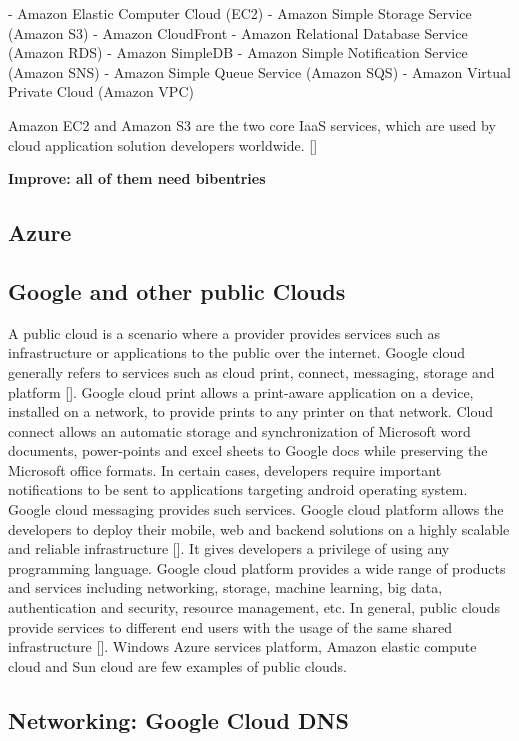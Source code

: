      -  Amazon Elastic Computer Cloud (EC2)
     -  Amazon Simple Storage Service (Amazon S3)
     -  Amazon CloudFront
     -  Amazon Relational Database Service (Amazon RDS)
     -  Amazon SimpleDB
     -  Amazon Simple Notification Service (Amazon SNS)
     -  Amazon Simple Queue Service (Amazon SQS)
     -  Amazon Virtual Private Cloud (Amazon VPC)

Amazon EC2 and Amazon S3 are the two core IaaS services, which are
used by cloud application solution developers
worldwide. [\cite{www-aws}]

     {\bf Improve: all of them need bibentries}
     
\subsection{Azure}
\subsection{Google and other public Clouds}

A public cloud is a scenario where a provider provides services such
as infrastructure or applications to the public over the
internet. Google cloud generally refers to services such as cloud
print, connect, messaging, storage and platform [\cite{goo1}]. Google
cloud print allows a print-aware application on a device, installed on
a network, to provide prints to any printer on that network. Cloud
connect allows an automatic storage and synchronization of Microsoft
word documents, power-points and excel sheets to Google docs while
preserving the Microsoft office formats. In certain cases, developers
require important notifications to be sent to applications targeting
android operating system. Google cloud messaging provides such
services. Google cloud platform allows the developers to deploy their
mobile, web and backend solutions on a highly scalable and reliable
infrastructure [\cite{goo2}]. It gives developers a privilege of using
any programming language. Google cloud platform provides a wide range
of products and services including networking, storage, machine
learning, big data, authentication and security, resource management,
etc. In general, public clouds provide services to different end users
with the usage of the same shared infrastructure [\cite{goo3}]. Windows
Azure services platform, Amazon elastic compute cloud and Sun cloud
are few examples of public clouds.
     
\subsection{Networking: Google Cloud DNS}

